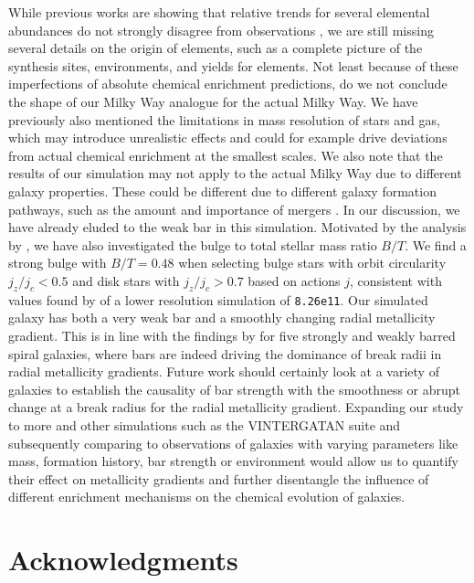 \documentclass[twocolumn,apj,numberedappendix,appendixfloats,twocolappendix]{openjournal}
\begin{document}
\begin{CJK*}{UTF8}{gbsn}
While previous works are showing that relative trends for several elemental abundances do not strongly disagree from observations \citep{Buck2021, Buder2024}, we are still missing several details on the origin of elements, such as a complete picture of the synthesis sites, environments, and yields for elements. Not least because of these imperfections of absolute chemical enrichment predictions, do we not conclude the shape of our Milky Way analogue for the actual Milky Way. We have previously also mentioned the limitations in mass resolution of stars and gas, which may introduce unrealistic effects and could for example drive deviations from actual chemical enrichment at the smallest scales. We also note that the results of our simulation may not apply to the actual Milky Way due to different galaxy properties. These could be different due to different galaxy formation pathways, such as the amount and importance of mergers \citep{Buck2023, Buder2024}. In our discussion, we have already eluded to the weak bar in this simulation. Motivated by the analysis by \citet{Tuntipong2024}, we have also investigated the bulge to total stellar mass ratio $B/T$. We find a strong bulge with $B/T = 0.48$ when selecting bulge stars with orbit circularity $j_z/j_c < 0.5$ and disk stars with $j_z/j_c > 0.7$ based on actions $j$, consistent with values found by \citet{Obreja2019} of a lower resolution simulation of \texttt{8.26e11}. Our simulated galaxy has both a very weak bar and a smoothly changing radial metallicity gradient. This is in line with the findings by \citet{Chen2023} for five strongly and weakly barred spiral galaxies, where bars are indeed driving the dominance of break radii in radial metallicity gradients. Future work should certainly look at a variety of galaxies to establish the causality of bar strength with the smoothness or abrupt change at a break radius for the radial metallicity gradient. Expanding our study to more and other simulations such as the \textsc{VINTERGATAN} suite \citep{Renaud2024} and subsequently comparing to observations of galaxies with varying parameters like mass, formation history, bar strength or environment would allow us to quantify their effect on metallicity gradients and further disentangle the influence of different enrichment mechanisms on the chemical evolution of galaxies.

\section*{Acknowledgments}


\end{CJK*}
\end{document}
